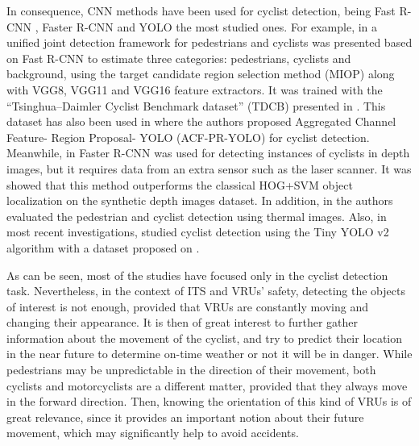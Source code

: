 \documentclass[journal]{IEEEtran}
\begin{document}
In consequence, CNN methods have been used for cyclist detection, being Fast R-CNN \cite{UnifiedCyclist2017,PedestrianCyclist2019}, Faster R-CNN \cite{CyclistLIDAR2017,chen2019thermal} and YOLO \cite{saranya2020cyclist,liu2019acf} the most studied ones. For example, in \cite{PedestrianCyclist2019} a unified joint detection framework for pedestrians and cyclists was presented based on Fast R-CNN to estimate three categories: pedestrians, cyclists and background, using the target candidate region selection method (MIOP) along with VGG8, VGG11 and VGG16 feature extractors. It was trained with the ``Tsinghua–Daimler Cyclist Benchmark dataset'' (TDCB) presented in \cite{BenchmarkCylistDetect2016}. This dataset has also been used in \cite{liu2019acf} where the authors proposed Aggregated Channel Feature- Region Proposal- YOLO (ACF-PR-YOLO) for cyclist detection. Meanwhile, in \cite{CyclistLIDAR2017} Faster R-CNN was used for detecting instances of cyclists in depth images, but it requires data from an extra sensor such as the laser scanner. It was showed that this method outperforms the classical HOG+SVM object localization on the synthetic depth images dataset. In addition, in \cite{chen2019thermal} the authors evaluated the pedestrian and cyclist detection using thermal images. Also, in most recent investigations, \cite{saranya2020cyclist} studied cyclist detection using the Tiny YOLO v2 algorithm with a dataset proposed on \cite{BenchmarkCylistDetect2016}. 

As can be seen, most of the studies have focused only in the cyclist detection task. Nevertheless, in the context of ITS and VRUs' safety, detecting the objects of interest is not enough, provided that VRUs are constantly moving and changing their appearance. It is then of great interest to further gather information about the movement of the cyclist, and try to predict their location in the near future to determine on-time weather or not it will be in danger. While pedestrians may be unpredictable in the direction of their movement, both cyclists and motorcyclists are a different matter, provided that they always move in the forward direction. Then, knowing the orientation of this kind of VRUs is of great relevance, since it provides an important notion about their future movement, which may significantly help to avoid accidents.
\end{document}
